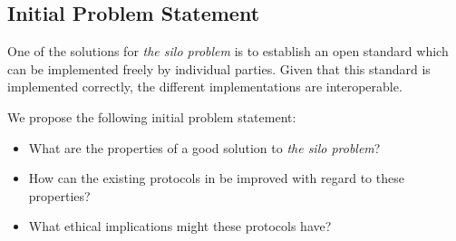 \subsection{Initial Problem Statement}\label{subsec:initial_problem_statement}
One of the solutions for \textit{the silo problem} is to establish an open standard which can be implemented freely by individual parties.
Given that this standard is implemented correctly, the different implementations are interoperable.

We propose the following initial problem statement:
\begin{itemize}
    \item What are the properties of a good solution to \textit{the silo problem}?
    \item How can the existing protocols in \cite{twitter_comms_protocol_comparison} be improved with regard to these properties?
    \item What ethical implications might these protocols have?
\end{itemize}